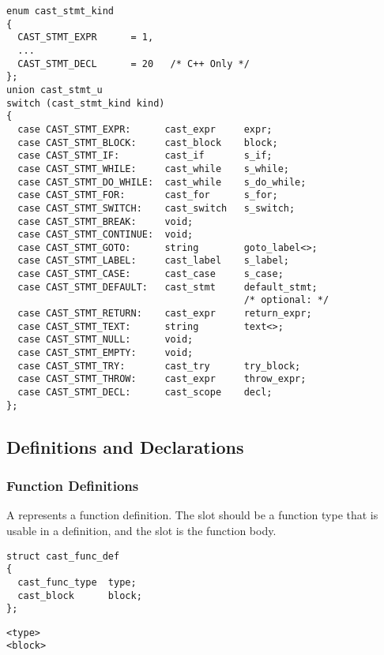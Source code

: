 \begin{verbatim}
enum cast_stmt_kind
{
  CAST_STMT_EXPR      = 1,
  ...
  CAST_STMT_DECL      = 20   /* C++ Only */
};
union cast_stmt_u
switch (cast_stmt_kind kind)
{
  case CAST_STMT_EXPR:      cast_expr     expr;
  case CAST_STMT_BLOCK:     cast_block    block;
  case CAST_STMT_IF:        cast_if       s_if;
  case CAST_STMT_WHILE:     cast_while    s_while;
  case CAST_STMT_DO_WHILE:  cast_while    s_do_while;
  case CAST_STMT_FOR:       cast_for      s_for;
  case CAST_STMT_SWITCH:    cast_switch   s_switch;
  case CAST_STMT_BREAK:     void;
  case CAST_STMT_CONTINUE:  void;
  case CAST_STMT_GOTO:      string        goto_label<>;
  case CAST_STMT_LABEL:     cast_label    s_label;
  case CAST_STMT_CASE:      cast_case     s_case;
  case CAST_STMT_DEFAULT:   cast_stmt     default_stmt;
                                          /* optional: */
  case CAST_STMT_RETURN:    cast_expr     return_expr;
  case CAST_STMT_TEXT:      string        text<>;
  case CAST_STMT_NULL:      void;
  case CAST_STMT_EMPTY:     void;
  case CAST_STMT_TRY:       cast_try      try_block;
  case CAST_STMT_THROW:     cast_expr     throw_expr;
  case CAST_STMT_DECL:      cast_scope    decl;
};
\end{verbatim}



\subsection{Definitions and Declarations}
\label{subsec:CAST:Definitions and Declarations}

\subsubsection{Function Definitions}

A  represents a function definition.  The
 slot should be a function type that is usable in a
definition, and the  slot is the function body.

\begin{verbatim}
struct cast_func_def
{
  cast_func_type  type;
  cast_block      block;
};
\end{verbatim}

\begin{verbatim}
<type>
<block>
\end{verbatim}

